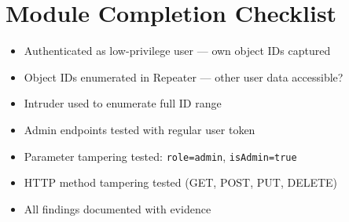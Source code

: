 \section{Module Completion Checklist}

\begin{tcolorbox}[findingstyle, title={Level 03 Burp Checklist}]
\begin{itemize}
  \item[\checkbox] Authenticated as low-privilege user — own object IDs captured
  \item[\checkbox] Object IDs enumerated in Repeater — other user data accessible?
  \item[\checkbox] Intruder used to enumerate full ID range
  \item[\checkbox] Admin endpoints tested with regular user token
  \item[\checkbox] Parameter tampering tested: \texttt{role=admin}, \texttt{isAdmin=true}
  \item[\checkbox] HTTP method tampering tested (GET, POST, PUT, DELETE)
  \item[\checkbox] All findings documented with evidence
\end{itemize}
\end{tcolorbox}
